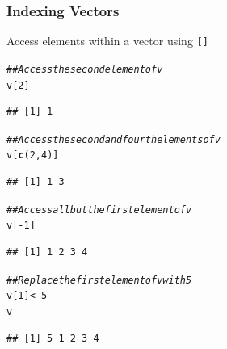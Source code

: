 \documentclass{beamer}\usepackage[]{graphicx}\usepackage[]{xcolor}
\makeatletter
\newcommand{\hlnum}[1]{\textcolor[rgb]{0.686,0.059,0.569}{#1}}%
\newcommand{\hlcom}[1]{\textcolor[rgb]{0.678,0.584,0.686}{\textit{#1}}}%
\newcommand{\hlopt}[1]{\textcolor[rgb]{0,0,0}{#1}}%
\newcommand{\hlstd}[1]{\textcolor[rgb]{0.345,0.345,0.345}{#1}}%
\newcommand{\hlkwb}[1]{\textcolor[rgb]{0.69,0.353,0.396}{#1}}%
\newcommand{\hlkwd}[1]{\textcolor[rgb]{0.737,0.353,0.396}{\textbf{#1}}}%
\newenvironment{kframe}{%
 \def\at@end@of@kframe{}%
 \ifinner\ifhmode%
  \def\at@end@of@kframe{\end{minipage}}%
  \begin{minipage}{\columnwidth}%
 \fi\fi%
 \def\FrameCommand##1{\hskip\@totalleftmargin \hskip-\fboxsep
 \colorbox{shadecolor}{##1}\hskip-\fboxsep
     \hskip-\linewidth \hskip-\@totalleftmargin \hskip\columnwidth}%
 \MakeFramed {\advance\hsize-\width
   \@totalleftmargin\z@ \linewidth\hsize
   \@setminipage}}%
 {\par\unskip\endMakeFramed%
 \at@end@of@kframe}
\newenvironment{knitrout}{}{} %
\makeatother
\begin{document}
\begin{frame}[fragile]\frametitle{Indexing Vectors}
    Access elements within a vector using \texttt{[]}
\begin{knitrout}\footnotesize
{}\color{fgcolor}\begin{kframe}
\begin{alltt}
\hlcom{## Access the second element of v}
\hlstd{v[}\hlnum{2}\hlstd{]}
\end{alltt}
\begin{verbatim}
## [1] 1
\end{verbatim}
\begin{alltt}
\hlcom{## Access the second and fourth elements of v}
\hlstd{v[}\hlkwd{c}\hlstd{(}\hlnum{2}\hlstd{,} \hlnum{4}\hlstd{)]}
\end{alltt}
\begin{verbatim}
## [1] 1 3
\end{verbatim}
\begin{alltt}
\hlcom{## Access all but the first element of v}
\hlstd{v[}\hlopt{-}\hlnum{1}\hlstd{]}
\end{alltt}
\begin{verbatim}
## [1] 1 2 3 4
\end{verbatim}
\begin{alltt}
\hlcom{## Replace the first element of v with 5}
\hlstd{v[}\hlnum{1}\hlstd{]} \hlkwb{<-} \hlnum{5}
\hlstd{v}
\end{alltt}
\begin{verbatim}
## [1] 5 1 2 3 4
\end{verbatim}
\end{kframe}
\end{knitrout}
\end{frame}
\end{document}
